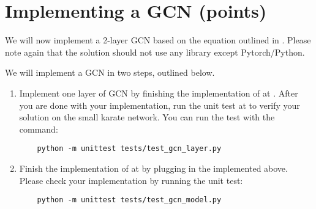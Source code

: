\section{Implementing a GCN (\qgcnpoints points)}
\label{sec:gcnimpl}
We will now implement a 2-layer GCN based on the equation outlined in . Please note again that the solution should not use any library except Pytorch/Python.

We will implement a GCN in two steps, outlined below.
\begin{enumerate}
    \item Implement one layer of GCN by finishing the implementation of  at . After you are done with your implementation, run the unit test at  to verify your solution on the small karate network. You can run the test with the command: 
    \begin{verbatim}
    python -m unittest tests/test_gcn_layer.py
    \end{verbatim}
    
    \item Finish the implementation of  at  by plugging in the  implemented above. Please check your implementation by running the unit test:
   \begin{verbatim}
    python -m unittest tests/test_gcn_model.py
    \end{verbatim}

\end{enumerate}